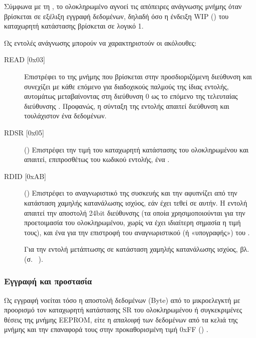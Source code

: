 Σύμφωνα με τη \textcite[6]{25lc1024}, το ολοκληρωμένο αγνοεί τις απόπειρες
ανάγνωσης μνήμης όταν βρίσκεται σε εξέλιξη εγγραφή δεδομένων, δηλαδή όσο η
ένδειξη WIP () του καταχωρητή κατάστασης βρίσκεται σε
λογικό 1.

Ως εντολές ανάγνωσης μπορούν να χαρακτηριστούν οι ακόλουθες:
\begin{description}
    \item[READ [0x03{]}] Επιστρέφει το  της μνήμης που βρίσκεται στην
    προσδιοριζόμενη διεύθυνση και συνεχίζει με κάθε επόμενο για διαδοχικούς
    παλμούς της ίδιας εντολής, αυτομάτως μεταβαίνοντας στη διεύθυνση 0 ως το
    επόμενο  της τελευταίας διεύθυνσης \parencite[6--7]{25lc1024}.
    Προφανώς, η σύνταξη της εντολής απαιτεί διεύθυνση και τουλάχιστον ένα
     δεδομένων.

    \item[RDSR [0x05{]}] () Επιστρέφει την τιμή του
    καταχωρητή κατάστασης του ολοκληρωμένου και απαιτεί, επιπροσθέτως του
    κωδικού εντολής, ένα  \parencite[10]{25lc1024}.

    \item[RDID [0xAB{]}] () Επιστρέφει το αναγνωριστικό της συσκευής
    και την αφυπνίζει από την κατάσταση χαμηλής κατανάλωσης ισχύος, εάν έχει
    τεθεί σε αυτήν. Η εντολή απαιτεί την αποστολή 24bit διεύθυνσης (τα οποία
    χρησιμοποιούνται για την προετοιμασία του ολοκληρωμένου, χωρίς να έχει
    ιδιαίτερη σημασία η τιμή τους), και ένα  για την επιστροφή του
    αναγνωριστικού (ή «υπογραφής») του \parencite[17]{25lc1024}
    \label{ssubsec:25lc1024:read-commands:rdid}.

    Για την εντολή μετάπτωσης σε κατάσταση χαμηλής κατανάλωσης ισχύος, βλ.
     (σ.~%
    \pageref{ssubsec:25lc1024:special-commands}).
\end{description}


\subsubsection{Εγγραφή και προστασία}
\label{ssubsec:25lc1024:write-protect}

Ως εγγραφή νοείται τόσο η αποστολή δεδομένων (Byte) από το μικροελεγκτή με
προορισμό τον καταχωρητή κατάστασης SR του ολοκληρωμένου ή συγκεκριμένες θέσεις
της μνήμης EEPROM, είτε η \emph{απαλοιφή} των δεδομένων από τα κελιά της μνήμης
και την επαναφορά τους στην προκαθορισμένη τιμή 0xFF ()
\parencite[6--7]{25lc1024}.

